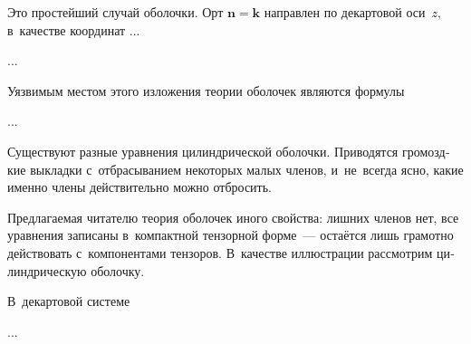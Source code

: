 
\begin{otherlanguage}{russian}

Это простейший случай оболочки. Орт ${\bm{n} = \bm{k}}$ направлен по декартовой оси~$z$, в~качестве координат ...

...



\end{otherlanguage}



\begin{otherlanguage}{russian}

Уязвимым местом этого изложения теории оболочек являются формулы

...



\end{otherlanguage}



\begin{otherlanguage}{russian}

Существуют разные уравнения цилиндрической оболочки. Приводятся громоздкие выкладки с~отбрасыванием некоторых малых членов, и~не~всегда ясно, какие именно члены действительно можно отбросить.

Предлагаемая читателю теория оболочек иного свойства: лишних членов нет, все уравнения записаны в~компактной тензорной форме~--- остаётся лишь грамотно действовать с~компонентами тензоров. В~качестве иллюстрации рассмотрим цилиндрическую оболочку.

В~декартовой системе

...



\end{otherlanguage}

